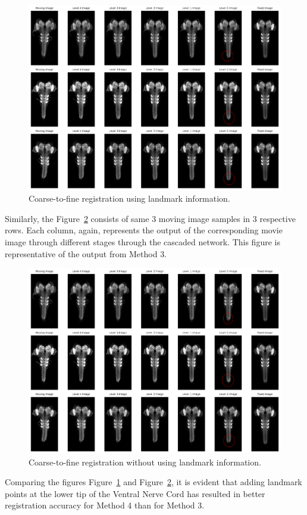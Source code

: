 \documentclass{report}
\begin{document}
	\begin{figure}[H]
		\centering
		\includegraphics[width=0.8\columnwidth]{resources/chapter4/method4/ldm/registered_images.png}
		\caption{Coarse-to-fine registration using landmark information.}
		\label{fig:method4_combine}
	\end{figure}

	Similarly, the Figure~\ref{fig:method3_combine} consists of same 3 moving image samples in 3 respective rows. Each column, again, represents the output of the corresponding movie image through different stages through the cascaded network. This figure is representative of the output from Method 3.
	
	\begin{figure}[H]
		\centering
		\includegraphics[width=0.8\columnwidth]{resources/chapter4/method4/vanilla/registered_images.png}
		\caption{Coarse-to-fine registration without using landmark information.}
		\label{fig:method3_combine}
	\end{figure}
	
	
	Comparing the figures Figure~\ref{fig:method4_combine} and Figure~\ref{fig:method3_combine}, it is evident that adding landmark points at the lower tip of the Ventral Nerve Cord has resulted in better registration accuracy for Method 4 than for Method 3.	
\end{document}
